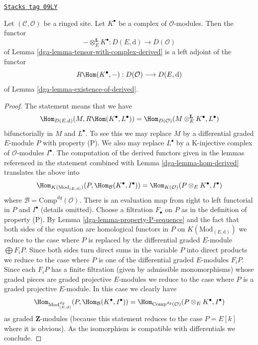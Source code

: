 \begin{lemma}
\label{dga-lemma-tensor-with-complex-hom-adjoint}
\href{https://stacks.math.columbia.edu/tag/09LY}{\texttt{Stacks tag 09LY}}

Let $(\mathcal{C}, \mathcal{O})$ be a ringed site.
Let $K^\bullet$ be a complex of $\mathcal{O}$-modules.
Then the functor
$$
- \otimes_E^\mathbf{L} K^\bullet :
D(E, \text{d})
\longrightarrow
D(\mathcal{O})
$$
of Lemma \ref{dga-lemma-tensor-with-complex-derived} is a left adjoint
of the functor
$$
R\Hom(K^\bullet, -) : D(\mathcal{O}) \longrightarrow D(E, \text{d})
$$
of Lemma \ref{dga-lemma-existence-of-derived}.
\end{lemma}

\begin{proof}

The statement means that we have
$$
\Hom_{D(E, \text{d})}(M, R\Hom(K^\bullet, L^\bullet)) =
\Hom_{D(\mathcal{O})}(M \otimes^\mathbf{L}_E K^\bullet, L^\bullet)
$$
bifunctorially in $M$ and $L^\bullet$. To see this we may replace $M$
by a differential graded $E$-module $P$ with property (P).
We also may replace $L^\bullet$ by a K-injective complex of
$\mathcal{O}$-modules $I^\bullet$. The computation
of the derived functors given in the lemmas referenced in the statement
combined with Lemma \ref{dga-lemma-hom-derived} translates the above into
$$
\Hom_{K(\text{Mod}_{(E, \text{d})})}
(P, \Hom_\mathcal{B}(K^\bullet, I^\bullet)) =
\Hom_{K(\mathcal{O})}(P \otimes_E K^\bullet, I^\bullet)
$$
where $\mathcal{B} = \text{Comp}^{dg}(\mathcal{O})$.
There is an evaluation map from right to left functorial
in $P$ and $I^\bullet$ (details omitted).
Choose a filtration $F_\bullet$ on $P$ as in the definition of property (P).
By Lemma \ref{dga-lemma-property-P-sequence} and the fact that
both sides of the equation are homological functors in $P$
on $K(\text{Mod}_{(E, \text{d})})$
we reduce to the case where $P$ is replaced by
the differential graded $E$-module $\bigoplus F_iP$.
Since both sides turn direct sums in the variable $P$
into direct products we reduce to the case where $P$ is one of the
differential graded $E$-modules $F_iP$.
Since each $F_iP$ has a finite filtration (given by admissible
monomorphisms) whose graded pieces are graded projective $E$-modules
we reduce to the case where $P$ is a graded projective $E$-module.
In this case we clearly have
$$
\Hom_{\text{Mod}^{dg}_{(E, \text{d})}}
(P, \Hom_\mathcal{B}(K^\bullet, I^\bullet)) =
\Hom_{\text{Comp}^{dg}(\mathcal{O})}(P \otimes_E K^\bullet, I^\bullet)
$$
as graded $\mathbf{Z}$-modules (because this statement reduces to the case
$P = E[k]$ where it is obvious). As the isomorphism is compatible with
differentials we conclude.
\end{proof}

